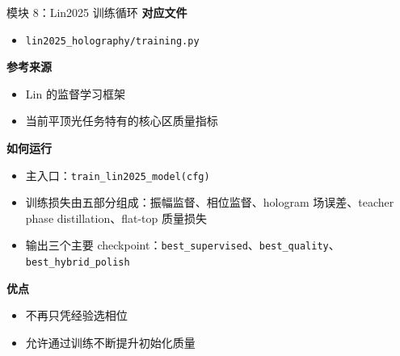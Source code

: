 \documentclass[aspectratio=169,10pt]{ctexbeamer}
\begin{document}
\begin{frame}{模块 8：Lin2025 训练循环}
  \textbf{对应文件}
  \begin{itemize}
    \item \texttt{lin2025\_holography/training.py}
  \end{itemize}

  \textbf{参考来源}
  \begin{itemize}
    \item Lin 的监督学习框架
    \item 当前平顶光任务特有的核心区质量指标
  \end{itemize}

  \textbf{如何运行}
  \begin{itemize}
    \item 主入口：\texttt{train\_lin2025\_model(cfg)}
    \item 训练损失由五部分组成：振幅监督、相位监督、hologram 场误差、teacher phase distillation、flat-top 质量损失
    \item 输出三个主要 checkpoint：\texttt{best\_supervised}、\texttt{best\_quality}、\texttt{best\_hybrid\_polish}
  \end{itemize}

  \textbf{优点}
  \begin{itemize}
    \item 不再只凭经验选相位
    \item 允许通过训练不断提升初始化质量
  \end{itemize}
\end{frame}
\end{document}
